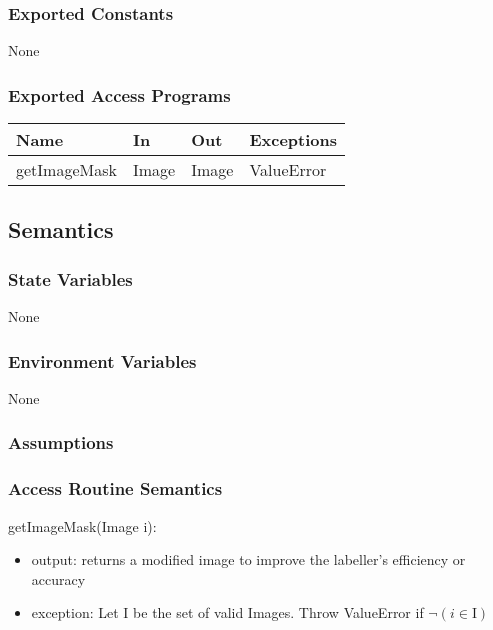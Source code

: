 \documentclass[12pt, titlepage]{article}
\begin{document}
  
  \subsubsection{Exported Constants}
  None
  \subsubsection{Exported Access Programs}
  
  \begin{center}
  \begin{tabular}{p{2cm} p{4cm} p{4cm} p{2cm}}
  \hline
  \textbf{Name} & \textbf{In} & \textbf{Out} & \textbf{Exceptions} \\
  \hline
  getImageMask & Image & Image & ValueError \\
  
  \end{tabular}
  \end{center}
  
  \subsection{Semantics}
  
  \subsubsection{State Variables}
  
 None
  
  \subsubsection{Environment Variables}
  
  None
  
  \subsubsection{Assumptions}
  
  
  \subsubsection{Access Routine Semantics}
  
  \noindent getImageMask(Image i):
  \begin{itemize}
  \item output: returns a modified image to improve the labeller's efficiency or accuracy
  \item exception: Let I be the set of valid Images. Throw ValueError if $\neg (i \in \text{I})$\\
  \end{itemize}
\end{document}
